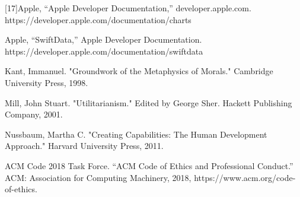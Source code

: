 \begin{thebibliography}{100}
     [17]Apple, “Apple Developer Documentation,” developer.apple.com. https://developer.apple.com/documentation/charts

     Apple, “SwiftData,” Apple Developer Documentation. https://developer.apple.com/documentation/swiftdata

     Kant, Immanuel. "Groundwork of the Metaphysics of Morals." Cambridge University Press, 1998.

     Mill, John Stuart. "Utilitarianism." Edited by George Sher. Hackett Publishing Company, 2001.

     Nussbaum, Martha C. "Creating Capabilities: The Human Development Approach." Harvard University Press, 2011.

     ACM Code 2018 Task Force. “ACM Code of Ethics and Professional Conduct.” ACM: Association for Computing Machinery, 2018, https://www.acm.org/code-of-ethics. 

\end{thebibliography}